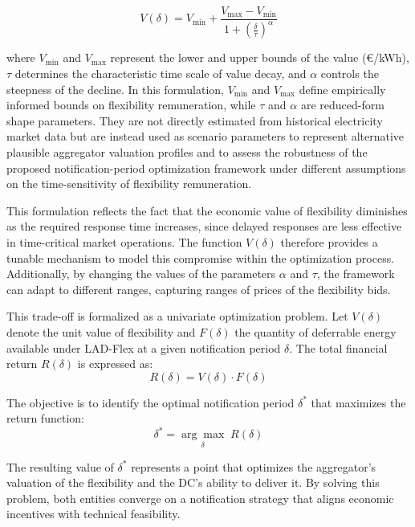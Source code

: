 \documentclass[preprint,12pt]{elsarticle}
\begin{document}
\begin{equation}
V(\delta) = V_{\min} + \frac{V_{\max} - V_{\min}}{1 + \left( \frac{\delta}{\tau} \right)^{\alpha}}
\label{smooth_decay}
\end{equation}

where \( V_{\min} \) and \( V_{\max} \) represent the lower and upper bounds of the value (€/kWh), \( \tau \) determines the characteristic time scale of value decay, and \( \alpha \) controls the steepness of the decline. In this formulation, \( V_{\min} \) and \( V_{\max} \) define empirically informed bounds on flexibility remuneration, while \( \tau \) and \( \alpha \) are reduced-form shape parameters. They are not directly estimated from historical electricity market data but are instead used as scenario parameters to represent alternative plausible aggregator valuation profiles and to assess the robustness of the proposed notification-period optimization framework under different assumptions on the time-sensitivity of flexibility remuneration.

This formulation reflects the fact that the economic value of flexibility diminishes as the required response time increases, since delayed responses are less effective in time-critical market operations. The function \( V(\delta) \) therefore provides a tunable mechanism to model this compromise within the optimization process. Additionally, by changing the values of the parameters $\alpha$ and $\tau$, the framework can adapt to different ranges, capturing ranges of prices of the flexibility bids.

This trade-off is formalized as a univariate optimization problem. Let \( V(\delta) \) denote the unit value of flexibility and \( F(\delta) \) the quantity of deferrable energy available under LAD-Flex at a given notification period \( \delta \). The total financial return \( R(\delta) \) is expressed as:
\begin{equation} \label{eq:max_returns}
    R(\delta) = V(\delta) \cdot F(\delta)
\end{equation}

The objective is to identify the optimal notification period \( \delta^* \) that maximizes the return function:
\begin{equation}
    \delta^* = \underset{\delta}{\arg\max} \; R(\delta)
\end{equation}

The resulting value of \( \delta^* \) represents a point that optimizes the aggregator’s valuation of the flexibility and the DC’s ability to deliver it. By solving this problem, both entities converge on a notification strategy that aligns economic incentives with technical feasibility.
\end{document}

